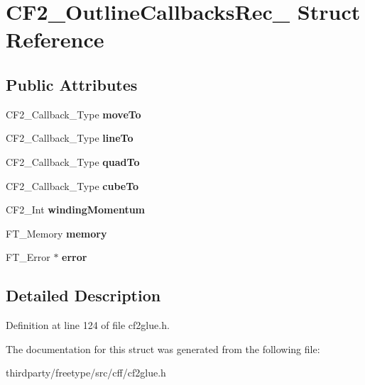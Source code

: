 \hypertarget{struct_c_f2___outline_callbacks_rec__}{}\section{C\+F2\+\_\+\+Outline\+Callbacks\+Rec\+\_\+ Struct Reference}
\label{struct_c_f2___outline_callbacks_rec__}
\subsection*{Public Attributes}
\begin{DoxyCompactItemize}
\item 
\mbox{\label{struct_c_f2___outline_callbacks_rec___a68e9aa3aadb2fdc6443aca436d81da76}} 
C\+F2\+\_\+\+Callback\+\_\+\+Type {\bfseries move\+To}
\item 
\mbox{\label{struct_c_f2___outline_callbacks_rec___ad2d791546ea3097d1e6805f6b4071491}} 
C\+F2\+\_\+\+Callback\+\_\+\+Type {\bfseries line\+To}
\item 
\mbox{\label{struct_c_f2___outline_callbacks_rec___aed59237e4c7f12ba2b433cf4ab22b53c}} 
C\+F2\+\_\+\+Callback\+\_\+\+Type {\bfseries quad\+To}
\item 
\mbox{\label{struct_c_f2___outline_callbacks_rec___a2705b35e074ba63e63d16204ce914b45}} 
C\+F2\+\_\+\+Callback\+\_\+\+Type {\bfseries cube\+To}
\item 
\mbox{\label{struct_c_f2___outline_callbacks_rec___a5fa7b7c0b5bf15a01118a52799b77008}} 
C\+F2\+\_\+\+Int {\bfseries winding\+Momentum}
\item 
\mbox{\label{struct_c_f2___outline_callbacks_rec___aa20064286aa1b4193c7a4c1ccbb2af41}} 
F\+T\+\_\+\+Memory {\bfseries memory}
\item 
\mbox{\label{struct_c_f2___outline_callbacks_rec___ad1760a05d54651976e7010506daf568c}} 
F\+T\+\_\+\+Error $\ast$ {\bfseries error}
\end{DoxyCompactItemize}


\subsection{Detailed Description}


Definition at line 124 of file cf2glue.\+h.



The documentation for this struct was generated from the following file\+:\begin{DoxyCompactItemize}
\item 
thirdparty/freetype/src/cff/cf2glue.\+h\end{DoxyCompactItemize}
